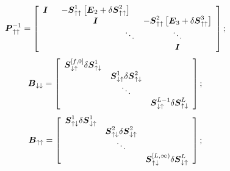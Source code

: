 \[
{\bmi P}_{ \uparrow \uparrow }^{-1}
=\left[{\begin{array}{ccc}
{\bmi I}&-{\bmi S}_{ \uparrow \uparrow }^{1} 
\left[{\bmi E}_{2}+{\mit \delta} {  \bmi S}_{ \uparrow \uparrow }^{2}\right]&\\ 
&{\bmi I}&  -{\bmi S}_{ \uparrow \uparrow }^{2} 
\left[{\bmi E}_{3}+{\mit \delta} {  \bmi S}_{ \uparrow \uparrow }^{3}\right]\\ 
&\hspace{8em} \ddots &\ddots  \\ 
&&{\bmi I}\end{array}}\right];
\]
\[
{\bmi B}_{ \downarrow \downarrow }=
\left[{\begin{array}{ccc}{\bmi S}_{ \downarrow \uparrow 
}^{[f,0]} {\mit \delta} {  \bmi S}_{\uparrow \downarrow }^{  
1}&&\\ 
&{\bmi S}_{\downarrow \uparrow }^{1} {\mit \delta} {  \bmi S}_{\uparrow \downarrow 
}^{  2}&\\ 
&\ddots&\\
&&{\bmi S}_{ \downarrow \uparrow }^{L-1} {\mit \delta} { 
 \bmi S}_{\uparrow \downarrow }^{  L}\end{array}}\right];
\] 
\[
{\bmi B}_{ \uparrow \uparrow }
=\left[{\begin{array}{ccc}{\bmi S}_{ 
\uparrow \downarrow }^{1} {\mit \delta} {  \bmi S}_{\downarrow \uparrow 
}^{  1}&&\\ &{\bmi S}_{\uparrow\downarrow }^{2} 
{\mit \delta}{\bmi S}_{\downarrow\uparrow}^{2}&\\
&\ddots&\\ &&{\bmi S}_{ \uparrow \downarrow }^{[L, \infty   )} 
{\mit \delta} {  \bmi S}_{\downarrow \uparrow }^{L}\end{array}}\right];
\]

